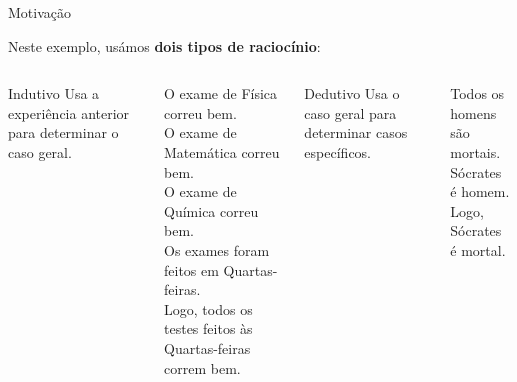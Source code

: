 \begin{frame}{Motivação \cont}

    Neste exemplo, usámos \textbf{dois tipos de raciocínio}:

    \bigskip

    \begin{columns}[T,onlytextwidth]
      
      \begin{block}{Indutivo}
        Usa a experiência anterior para \alert{determinar o caso geral}.
      \end{block}
       
       \medskip
       
      \scriptsize{O exame de Física correu bem.}\\
      \scriptsize{O exame de Matemática correu bem.}\\
      \scriptsize{O exame de Química correu bem.}\\
      \scriptsize{Os exames foram feitos em Quartas-feiras.}\\
      \scriptsize{Logo, todos os testes feitos às Quartas-feiras correm bem.}


      \begin{block}{Dedutivo}
        Usa o caso geral para \alert{determinar casos específicos}.
      \end{block}

      \medskip
      
      \scriptsize{Todos os homens são mortais.}\\
      \scriptsize{Sócrates é homem.}\\
      \scriptsize{Logo, Sócrates é mortal.}
      
  \end{columns}

\end{frame}

